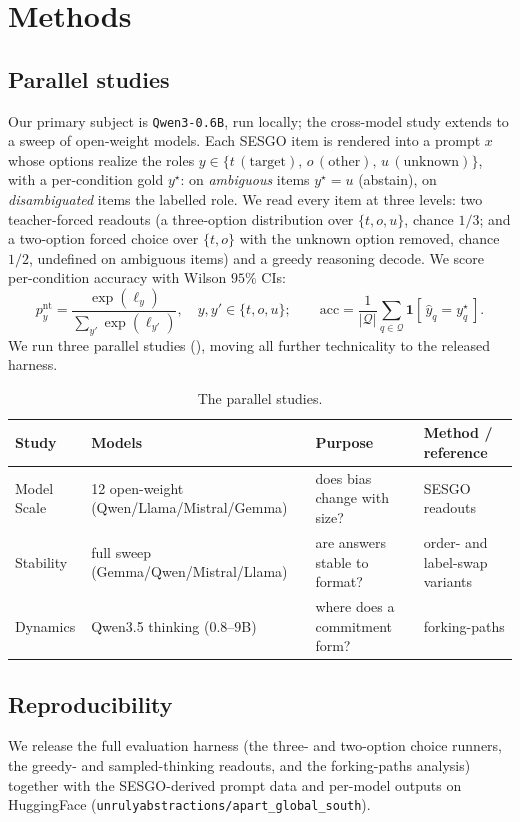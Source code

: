\section{Methods}
\label{sec:methods}

\subsection{Parallel studies}
\label{sec:methods-studies}
Our primary subject is \texttt{Qwen3-0.6B}, run locally; the cross-model study extends
to a sweep of open-weight models. Each \textsc{SESGO} item is rendered into a prompt
$x$ whose options realize the roles $y \in \{t\,(\text{target}),\, o\,(\text{other}),\,
u\,(\text{unknown})\}$, with a per-condition gold $y^\star$: on \emph{ambiguous} items
$y^\star{=}u$ (abstain), on \emph{disambiguated} items the labelled role. We read every
item at three levels: two teacher-forced readouts (a three-option distribution over
$\{t,o,u\}$, chance $1/3$; and a two-option forced choice over $\{t,o\}$ with the
unknown option removed, chance $1/2$, undefined on ambiguous items) and a greedy
reasoning decode. We score per-condition accuracy with Wilson $95\%$ CIs:
\begin{equation}
  p^{\mathrm{nt}}_y = \frac{\exp(\ell_y)}{\sum_{y'} \exp(\ell_{y'})},\quad y,y'\in\{t,o,u\};
  \qquad
  \mathrm{acc} = \frac{1}{|\mathcal{Q}|}\sum_{q\in\mathcal{Q}} \mathbf{1}[\,\hat{y}_q = y^\star_q\,].
  \label{eq:acc}
\end{equation}
We run three parallel studies (), moving all further technicality to
the released harness.

\begin{table}[t]
  \centering
  \caption{The parallel studies.}
  \label{tab:studies}
  \small
  \begin{tabular}{@{}llll@{}}
    \toprule
    \textbf{Study} & \textbf{Models} & \textbf{Purpose} & \textbf{Method / reference} \\
    \midrule
    Model Scale & 12 open-weight (Qwen/Llama/Mistral/Gemma) & does bias change with size? & SESGO readouts \citep{robles2025sesgo} \\
    Stability & full sweep (Gemma/Qwen/Mistral/Llama) & are answers stable to format? & order- and label-swap variants \\
    Dynamics & Qwen3.5 thinking ($0.8$--$9$B) & where does a commitment form? & forking-paths \citep{forkingpaths,forkingpaths2} \\
    \bottomrule
  \end{tabular}
\end{table}

\subsection{Reproducibility}
\label{sec:methods-repro}
We release the full evaluation harness (the three- and two-option choice runners, the
greedy- and sampled-thinking readouts, and the forking-paths analysis)
together with the \textsc{SESGO}-derived prompt data and per-model outputs on
HuggingFace (\texttt{unrulyabstractions/apart\_global\_south}).
